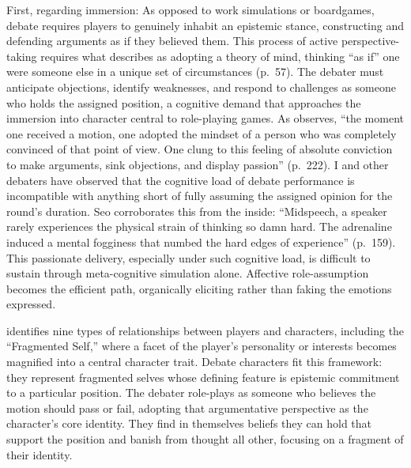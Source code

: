 First, regarding immersion: As opposed to work simulations or boardgames, debate requires players to genuinely inhabit an epistemic stance, constructing and defending arguments as if they believed them. This process of active perspective-taking requires what \textcite{bowman2010functions} describes as adopting a theory of mind, thinking ``as if'' one were someone else in a unique set of circumstances (p.~57). The debater must anticipate objections, identify weaknesses, and respond to challenges as someone who holds the assigned position, a cognitive demand that approaches the immersion into character central to role-playing games. As \textcite{seo2022good} observes, ``the moment one received a motion, one adopted the mindset of a person who was completely convinced of that point of view. One clung to this feeling of absolute conviction to make arguments, sink objections, and display passion'' (p.~222). I and other debaters have observed that the cognitive load of debate performance is incompatible with anything short of fully assuming the assigned opinion for the round's duration. Seo corroborates this from the inside: ``Midspeech, a speaker rarely experiences the physical strain of thinking so damn hard. The adrenaline induced a mental fogginess that numbed the hard edges of experience'' (p.~159). This passionate delivery, especially under such cognitive load, is difficult to sustain through meta-cognitive simulation alone. Affective role-assumption becomes the efficient path, organically eliciting rather than faking the emotions expressed.

\textcite{bowman2010functions} identifies nine types of relationships between players and characters, including the ``Fragmented Self,'' where a facet of the player's personality or interests becomes magnified into a central character trait. Debate characters fit this framework: they represent fragmented selves whose defining feature is epistemic commitment to a particular position. The debater role-plays as someone who believes the motion should pass or fail, adopting that argumentative perspective as the character's core identity. They find in themselves beliefs they can hold that support the position and banish from thought all other, focusing on a fragment of their identity.

